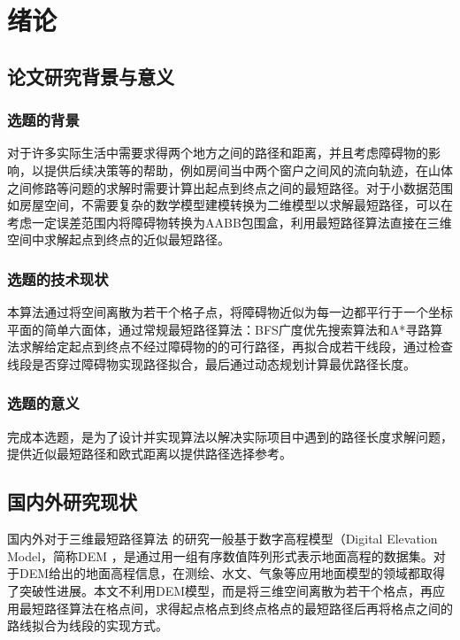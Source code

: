 \chapter{绪论}
 
 \section{论文研究背景与意义}
\subsection{选题的背景}
\par 对于许多实际生活中需要求得两个地方之间的路径和距离，并且考虑障碍物的影响，以提供后续决策等的帮助，例如房间当中两个窗户之间风的流向轨迹，在山体之间修路等问题的求解时需要计算出起点到终点之间的最短路径。对于小数据范围如房屋空间，不需要复杂的数学模型建模转换为二维模型以求解最短路径，可以在考虑一定误差范围内将障碍物转换为AABB包围盒，利用最短路径算法直接在三维空间中求解起点到终点的近似最短路径。
\subsection{选题的技术现状}
\par 本算法通过将空间离散为若干个格子点，将障碍物近似为每一边都平行于一个坐标平面的简单六面体，通过常规最短路径算法：BFS广度优先搜索算法和A*寻路算法求解给定起点到终点不经过障碍物的的可行路径，再拟合成若干线段，通过检查线段是否穿过障碍物实现路径拟合，最后通过动态规划计算最优路径长度。
\subsection{选题的意义}
\par 完成本选题，是为了设计并实现算法以解决实际项目中遇到的路径长度求解问题，提供近似最短路径和欧式距离以提供路径选择参考。
\section{国内外研究现状}
\par 国内外对于三维最短路径算法 \cite{r3}\cite{r5}的研究一般基于数字高程模型（Digital Elevation Model，简称DEM \cite{r2}，是通过用一组有序数值阵列形式表示地面高程的数据集。对于DEM给出的地面高程信息，在测绘、水文、气象等应用地面模型的领域都取得了突破性进展。本文不利用DEM模型，而是将三维空间离散为若干个格点，再应用最短路径算法在格点间，求得起点格点到终点格点的最短路径后再将格点之间的路线拟合为线段的实现方式。
